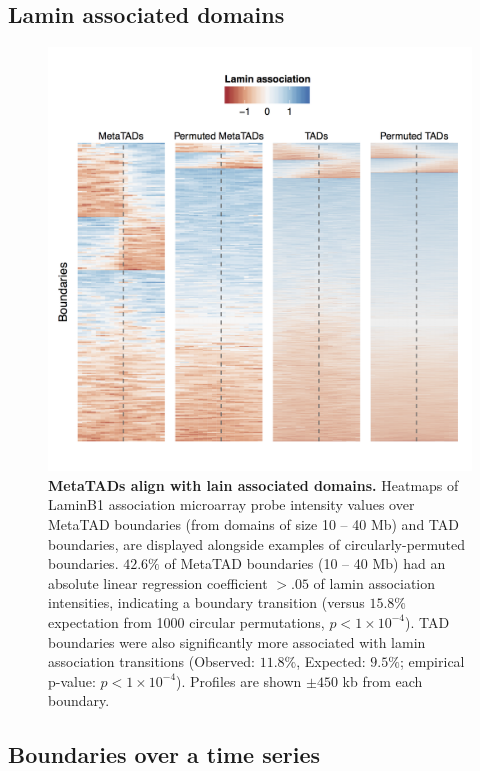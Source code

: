 \documentclass[a4paper,10pt,oneside]{book}
\begin{document}
\subsection{Lamin associated domains}

\begin{figure}
\begin{center} 
\includegraphics[width=.9\textwidth]{figs/mt_laminperm.png}
\captionsetup{width=\textwidth}
\caption{ {\bf MetaTADs align with lain associated domains.}
Heatmaps of LaminB1 association microarray probe intensity values over MetaTAD boundaries (from domains of size 10 -- 40 Mb) and TAD boundaries, are displayed alongside examples of circularly-permuted boundaries. $42.6\%$ of MetaTAD boundaries (10 -- 40 Mb) had an absolute linear regression coefficient $>.05$ of lamin association intensities, indicating a boundary transition (versus $15.8\%$ expectation from 1000 circular permutations, $p < 1 \times 10^{-4}$). TAD boundaries were also significantly more associated with lamin association transitions (Observed: $11.8\%$, Expected: $9.5\%$; empirical p-value: $p < 1 \times 10^{-4}$). Profiles are shown $\pm450$ kb from each boundary.
}\label{fig:mtlamin}
\end{center}
\end{figure} 

\subsection{Boundaries over a time series}
\end{document}
